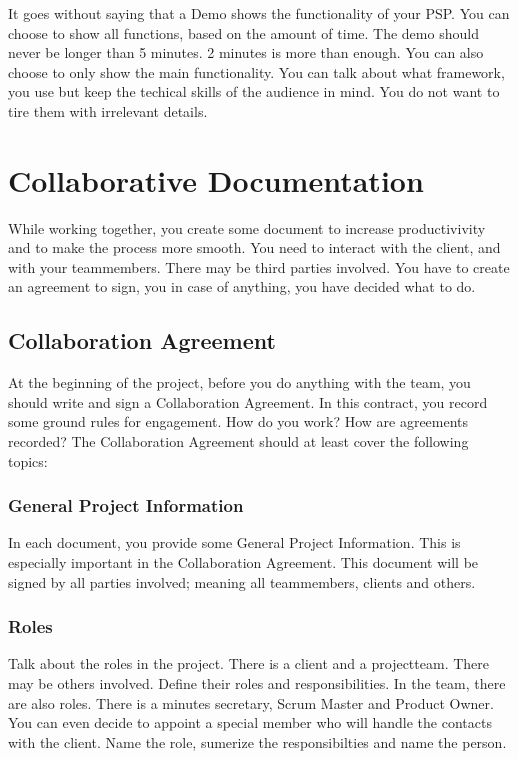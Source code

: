 \documentclass[10pt]{report}
\begin{document}
\noindent It goes without saying that a Demo shows the functionality of your PSP. You can choose to show all functions, based on the amount of time. The demo should never be longer than 5 minutes. 2 minutes is more than enough. You can also choose to only show the main functionality. You can talk about what framework, you use but keep the techical skills of the audience in mind. You do not want to tire them with irrelevant details.

\newpage

\chapter{Collaborative Documentation}

While working together, you create some document to increase productivivity and to make the process more smooth. You need to interact with the client, and with your teammembers. There may be third parties involved. You have to create an agreement to sign, you in case of anything, you have decided what to do.

\medskip
\minitoc

\newpage

\section{Collaboration Agreement}

At the beginning of the project, before you do anything with the team, you should write and sign a Collaboration Agreement. In this contract, you record some ground rules for engagement. How do you work? How are agreements recorded? The Collaboration Agreement should at least cover the following topics:

\subsection{General Project Information}

In each document, you provide some General Project Information. This is especially important in the Collaboration Agreement. This document will be signed by all parties involved; meaning all teammembers, clients and others.

\subsection{Roles}

Talk about the roles in the project. There is a client and a projectteam. There may be others involved. Define their roles and responsibilities. In the team, there are also roles. There is a minutes secretary, Scrum Master and Product Owner. You can even decide to appoint a special member who will handle the contacts with the client. Name the role, sumerize the responsibilties and name the person.
\end{document}
